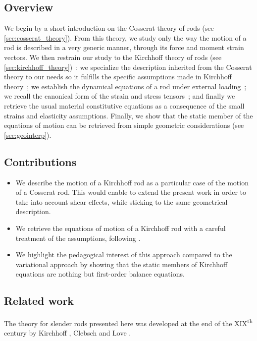 \subsection{Overview}

We begin by a short introduction on the Cosserat theory of rods (see \cref{sec:cosserat_theory}). From this theory, we study only the way the motion of a rod is described in a very generic manner, through its force and moment strain vectors. We then restrain our study to the Kirchhoff theory of rods (see \cref{sec:kirchhoff_theory})~: we specialize the description inherited from the Cosserat theory to our needs so it fulfills the specific assumptions made in Kirchhoff theory~; we establish the dynamical equations of a rod under external loading~; we recall the canonical form of the strain and stress tensors~; and finally we retrieve the usual material constitutive equations as a consequence of the small strains and elasticity assumptions. Finally, we show that the static member of the equations of motion can be retrieved from simple geometric considerations (see \cref{sec:geointerp}).

\subsection{Contributions}
\begin{itemize}
\item We describe the motion of a Kirchhoff rod as a particular case of the motion of a Cosserat rod. This would enable to extend the present work in order to take into account shear effects, while sticking to the same geometrical description.
\item We retrieve the equations of motion of a Kirchhoff rod with a careful treatment of the assumptions, following \cite{Dill1992}.
\item We highlight the pedagogical interest of this approach compared to the variational approach by showing that the static members of Kirchhoff equations are nothing but first-order balance equations.
\end{itemize}

\subsection{Related work}

The theory for slender rods presented here was developed at the end of the XIX\textsuperscript{th} century by Kirchhoff \cite{Kirchhoff1850,Kirchhoff1876}, Clebsch \cite{Clebsch1883} and Love \cite{Love1906}.

